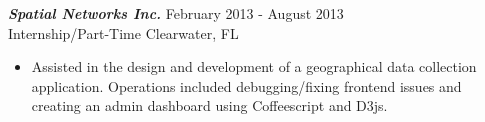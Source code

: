 {\sl \textbf{Spatial Networks Inc.}} \hfill February 2013 - August 2013 \\
Internship/Part-Time \hfill Clearwater, FL
\begin{itemize}
    \item Assisted in the design and development of a geographical data collection application. Operations included debugging/fixing frontend issues and creating an admin dashboard using Coffeescript and D3js.
\end{itemize}
